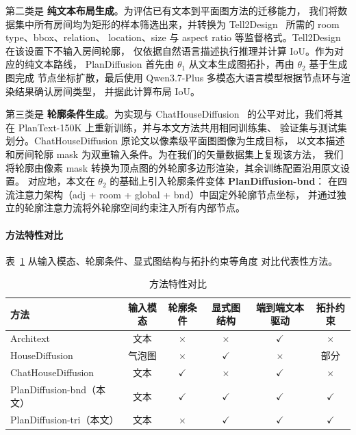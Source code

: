 第二类是 \textbf{纯文本布局生成}。为评估已有文本到平面图方法的迁移能力，
我们将数据集中所有房间均为矩形的样本筛选出来，并转换为
Tell2Design~\cite{leng2023tell2design} 所需的 room type、bbox、relation、
location、size 与 aspect ratio 等监督格式。Tell2Design 在该设置下不输入房间轮廓，
仅依据自然语言描述执行推理并计算 IoU。作为对应的纯文本路线，
PlanDiffusion 首先由 $\theta_1$ 从文本生成图拓扑，再由 $\theta_2$ 基于生成图完成
节点坐标扩散，最后使用 Qwen3.7-Plus 多模态大语言模型根据节点环与渲染结果确认房间类型，
并据此计算布局 IoU。

第三类是 \textbf{轮廓条件生成}。为实现与 ChatHouseDiffusion~\cite{qin2025chathousediffusion}
的公平对比，我们将其在 PlanText-150K 上重新训练，并与本文方法共用相同训练集、
验证集与测试集划分。ChatHouseDiffusion 原论文以像素级平面图图像为生成目标，
以文本描述和房间轮廓 mask 为双重输入条件。为在我们的矢量数据集上复现该方法，
我们将轮廓由像素 mask 转换为顶点图的外轮廓多边形渲染，其余训练配置沿用原文设置。
对应地，本文在 $\theta_2$ 的基础上引入轮廓条件变体 \textbf{PlanDiffusion-bnd}：
在四流注意力架构（adj + room + global + bnd）中固定外轮廓节点坐标，
并通过独立的轮廓注意力流将外轮廓空间约束注入所有内部节点。

\paragraph{方法特性对比}
表~\ref{tab:method_comparison} 从输入模态、轮廓条件、显式图结构与拓扑约束等角度
对比代表性方法。

\begin{table}[h]
\centering
\caption{方法特性对比}
\label{tab:method_comparison}
\small
\begin{tabular}{lccccc}
\toprule
方法 & 输入模态 & 轮廓条件 & 显式图结构 & 端到端文本驱动 & 拓扑约束 \\
\midrule
Architext~\cite{galanos2023architext}               & 文本     & $\times$     & $\times$     & $\checkmark$ & $\times$ \\
HouseDiffusion~\cite{shabani2023housediffusion}     & 气泡图   & $\times$     & $\checkmark$ & $\times$     & 部分 \\
ChatHouseDiffusion~\cite{qin2025chathousediffusion} & 文本     & $\checkmark$ & $\times$     & $\checkmark$ & $\times$ \\
\midrule
PlanDiffusion-bnd（本文）  & 文本 & $\checkmark$ & $\checkmark$ & $\checkmark$ & $\checkmark$ \\
PlanDiffusion-tri（本文）  & 文本 & $\times$     & $\checkmark$ & $\checkmark$ & $\checkmark$ \\
\bottomrule
\end{tabular}
\end{table}

